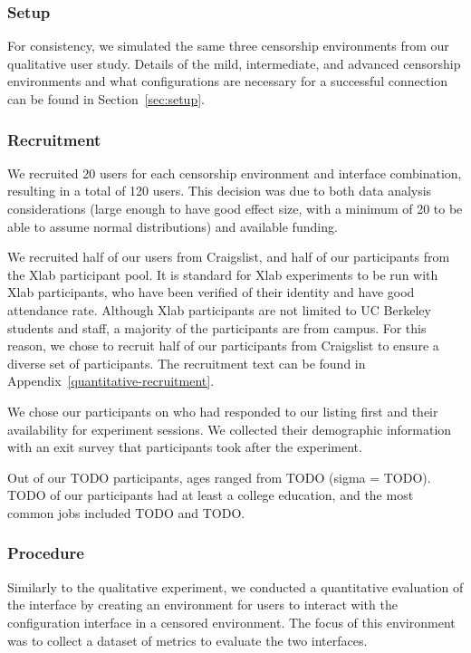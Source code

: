 \documentclass[USenglish,oneside,twocolumn]{article}
\begin{document}
\subsubsection{Setup}
For consistency, we simulated the same three censorship environments from 
our qualitative user study. Details of the mild, intermediate, and advanced 
censorship environments and what configurations are necessary for a 
successful connection can be found in Section~\ref{sec:setup}. 

\subsubsection{Recruitment}
We recruited 20 users for each censorship environment
and interface combination, resulting in a total of 120 users. This decision 
was due to both data analysis considerations (large enough to have good effect size, 
with a minimum of 20 to be able to assume normal distributions) and
available funding.

We recruited half of our users from Craigslist, and half of our participants from 
the Xlab participant pool. It is standard for Xlab experiments to be run with Xlab
participants, who have been verified of their identity and have good attendance
rate. Although Xlab participants are not limited to UC Berkeley students and staff,
a majority of the participants are from campus. For this reason, we chose to recruit 
half of our participants from Craigslist to ensure a diverse set of participants. 
The recruitment text can be found in Appendix~\ref{quantitative-recruitment}. 

We chose our participants on who had responded to our listing first and their
availability for experiment sessions. We collected their demographic information
with an exit survey that participants took after the experiment. 

Out of our {\color {red} TODO} participants, ages ranged from {\color {red} TODO}
(sigma = {\color {red} TODO}). {\color {red} TODO} of our participants had at least
a college education, and the most common jobs included {\color {red} TODO} and
{\color {red} TODO}. 

\subsubsection{Procedure}
Similarly to the qualitative experiment, we conducted a quantitative evaluation 
of the interface by creating an environment  for users to interact with the 
configuration interface in a censored environment. The focus of this environment 
was to collect a dataset of metrics to evaluate the two interfaces. 
\end{document}
